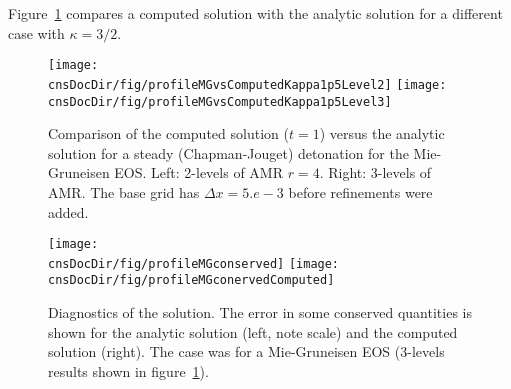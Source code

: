 \documentclass{article}
\newcommand{\obDir}{\homeHenshaw/res/OverBlown}
\newcommand{\cnsDocDir}{../cns}
\begin{document}
Figure~\ref{fig:detonationCJComparisonKappa1p5} compares a computed solution with the analytic solution for
a different case with $\kappa=3/2$.
\begin{figure}[hbt]
\begin{center}
  \texttt{[image: \\cnsDocDir/fig/profileMGvsComputedKappa1p5Level2]}
  \texttt{[image: \\cnsDocDir/fig/profileMGvsComputedKappa1p5Level3]}
 \end{center}
\caption{Comparison of the computed solution ($t=1$) versus the analytic solution for a steady (Chapman-Jouget) detonation for the Mie-Gruneisen EOS. Left: 2-levels of AMR $r=4$. Right: 3-levels of AMR. The
base grid has $\Delta x = 5.e-3$ before refinements were added.} \label{fig:detonationCJComparisonKappa1p5}
\end{figure}
% 



\begin{figure}[hbt]
\begin{center}
  \texttt{[image: \\cnsDocDir/fig/profileMGconserved]}
  \texttt{[image: \\cnsDocDir/fig/profileMGconervedComputed]}
 \end{center}
\caption{Diagnostics of the solution. The error in some conserved quantities is shown for
   the analytic solution (left, note scale) and the computed solution (right). The case was for a 
    Mie-Gruneisen EOS (3-levels results shown in figure~\ref{fig:detonationCJComparisonKappa1p5}). } 
   \label{fig:detonationConserved}
\end{figure}

% 
\end{document}
